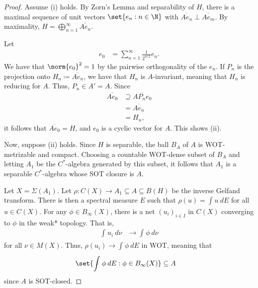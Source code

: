 \documentclass[10pt]{mypackage}
\renewcommand{\coloneq}{\coloneqq}
\begin{document}
\begin{proof}
  Assume (i) holds. By Zorn's Lemma and separability of $H$, there is a maximal sequence of unit vectors $\set{e_n : n\in \N}$ with $ \overline{Ae_n} \perp \overline{Ae_m} $. By maximality, $H = \bigoplus_{n=1}^{\infty} \overline{Ae_n}$.

  Let
  \begin{align*}
    e_0 &= \sum_{n=1}^{\infty} \frac{1}{2^{n/2}}e_n.
  \end{align*}
  We have that $\norm{e_0}^2 = 1$ by the pairwise orthogonality of the $e_n$. If $P_n$ is the projection onto $H_n\coloneq \overline{Ae_n}$, we have that $H_n$ is $A$-invariant, meaning that $H_n$ is reducing for $A$. Thus, $P_n\in A' = A$. Since
  \begin{align*}
    \overline{Ae_0} &\supseteq \overline{AP_ne_0}\\
                    &= \overline{Ae_n}\\
                    &= H_n,
  \end{align*}
  it follows that $ \overline{Ae_0} = H $, and $e_0$ is a cyclic vector for $A$. This shows (ii).

  Now, suppose (ii) holds. Since $H$ is separable, the ball $B_A$ of $A$ is WOT-metrizable and compact. Choosing a countable WOT-dense subset of $B_A$ and letting $A_1$ be the $C^{\ast}$-algebra generated by this subset, it follows that $A_1$ is a separable $C^{\ast}$-algebra whose SOT closure is $A$.

  Let $X = \Sigma\left( A_1 \right)$. Let $\rho\colon C\left( X \right)\to A_1\subseteq A\subseteq B(H)$ be the inverse Gelfand transform. There is then a spectral measure $E$ such that $\rho(u) = \int_{}^{} u\:dE$ for all $u\in C(X)$. For any $\phi\in B_{\infty}(X)$, there is a net $\left( u_i \right)_{i\in I}$ in $C(X)$ converging to $\phi$ in the weak* topology. That is,
  \begin{align*}
    \int_{}^{} u_i\:d\nu &\to \int_{}^{} \phi\:d\nu
  \end{align*}
  for all $\nu\in M(X)$. Thus, $ \rho\left( u_i \right) \to \int_{}^{} \phi\:dE $ in WOT, meaning that
  \begin{align*}
    \set{ \int_{}^{} \phi\:dE : \phi\in B_{\infty}(X) } &\subseteq A
  \end{align*}
  since $A$ is SOT-closed.


\end{proof}
\end{document}
